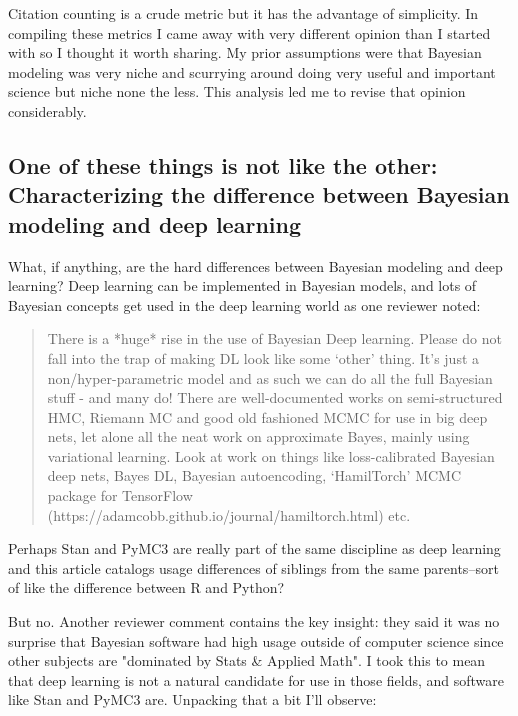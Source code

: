 \documentclass[AMA,STIX1COL]{WileyNJD-v2}
\begin{document}
Citation counting is a crude metric but it has the advantage of simplicity. In compiling these metrics I came away with very different opinion than I started with so I thought it worth sharing. My prior assumptions were that Bayesian modeling was very niche and scurrying around doing very useful and important science but niche none the less. This analysis led me to revise that opinion considerably. 

\subsection{One of these things is not like the other: Characterizing the difference between Bayesian modeling and deep learning}

What, if anything, are the hard differences between Bayesian modeling and deep learning? Deep learning can be implemented in Bayesian models, and lots of Bayesian concepts get used in the deep learning world as one reviewer noted:

\begin{quote}
There is a *huge* rise in the use of Bayesian Deep learning. Please do not fall into the trap of making DL look like some ‘other’ thing. It’s just a non/hyper-parametric model and as such we can do all the full Bayesian stuff - and many do! There are well-documented works on semi-structured HMC, Riemann MC and good old fashioned MCMC for use in big deep nets, let alone all the neat work on approximate Bayes, mainly using variational learning. Look at work on things like loss-calibrated Bayesian deep nets, Bayes DL, Bayesian autoencoding, ‘HamilTorch’ MCMC package for TensorFlow (https://adamcobb.github.io/journal/hamiltorch.html) etc.
\end{quote}

Perhaps Stan and PyMC3 are really part of the same discipline as deep learning and this article catalogs usage differences of siblings from the same parents--sort of like the difference between R and Python? 

But no. Another reviewer comment contains the key insight: they said it was no surprise that Bayesian software had high usage outside of computer science since other subjects are "dominated by Stats \& Applied Math". I took this to mean that deep learning is not a natural candidate for use in those fields, and software like Stan and PyMC3 are. Unpacking that a bit I'll observe:
\end{document}
